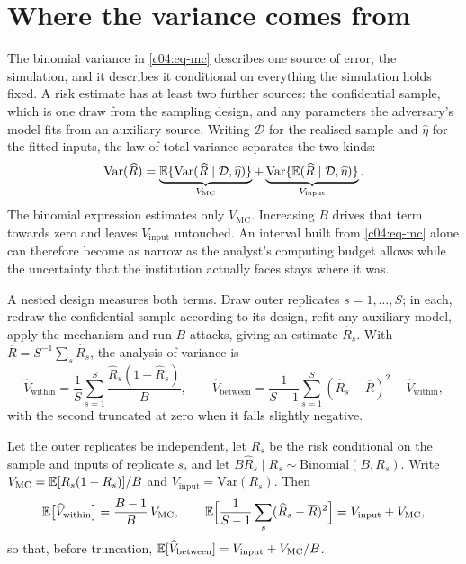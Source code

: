 \section{Where the variance comes from}\label{c04:sec-layers}

The binomial variance in \eqref{c04:eq-mc} describes one source of error, the
simulation, and it describes it conditional on everything the simulation holds fixed.
A risk estimate has at least two further sources: the confidential sample, which is one
draw from the sampling design, and any parameters the adversary's model fits from an
auxiliary source. Writing $\mathcal{D}$ for the realised sample and $\widehat\eta$ for
the fitted inputs, the law of total variance separates the two kinds:
\begin{equation}\label{c04:eq-total}
\mathrm{Var}(\widehat R)
= \underbrace{\mathbb{E}\{\mathrm{Var}(\widehat R \mid \mathcal{D},\widehat\eta)\}}_{V_{\mathrm{MC}}}
 + \underbrace{\mathrm{Var}\{\mathbb{E}(\widehat R \mid \mathcal{D},\widehat\eta)\}}_{V_{\mathrm{input}}}.
\end{equation}
The binomial expression estimates only $V_{\mathrm{MC}}$. Increasing $B$ drives that term
towards zero and leaves $V_{\mathrm{input}}$ untouched. An interval built from
\eqref{c04:eq-mc} alone can therefore become as narrow as the analyst's computing budget
allows while the uncertainty that the institution actually faces stays where it was.

A nested design measures both terms. Draw outer replicates $s = 1, \dots, S$; in each,
redraw the confidential sample according to its design, refit any auxiliary model, apply
the mechanism and run $B$ attacks, giving an estimate $\widehat R_s$. With
$\overline{R} = S^{-1}\sum_s\widehat R_s$, the analysis of variance is
\begin{equation}\label{c04:eq-nested}
\widehat V_{\mathrm{within}} = \frac{1}{S}\sum_{s=1}^{S}\frac{\widehat R_s(1-\widehat R_s)}{B},
\qquad
\widehat V_{\mathrm{between}} = \frac{1}{S-1}\sum_{s=1}^{S}(\widehat R_s - \overline R)^2
 - \widehat V_{\mathrm{within}},
\end{equation}
with the second truncated at zero when it falls slightly negative.

\begin{proposition}\label{c04:prop-nested}
Let the outer replicates be independent, let $R_s$ be the risk conditional on the
sample and inputs of replicate $s$, and let $B\widehat R_s \mid R_s \sim
\mathrm{Binomial}(B,R_s)$. Write $V_{\mathrm{MC}} = \mathbb{E}[R_s(1-R_s)]/B$ and
$V_{\mathrm{input}} = \mathrm{Var}(R_s)$. Then
\begin{equation}\label{c04:eq-nested-exp}
\mathbb{E}\big[\widehat V_{\mathrm{within}}\big] = \frac{B-1}{B}\,V_{\mathrm{MC}},
\qquad
\mathbb{E}\Big[\frac{1}{S-1}\sum_{s}(\widehat R_s-\overline R)^2\Big] = V_{\mathrm{input}} + V_{\mathrm{MC}},
\end{equation}
so that, before truncation, $\mathbb{E}[\widehat V_{\mathrm{between}}] = V_{\mathrm{input}} +
V_{\mathrm{MC}}/B$.
\end{proposition}

